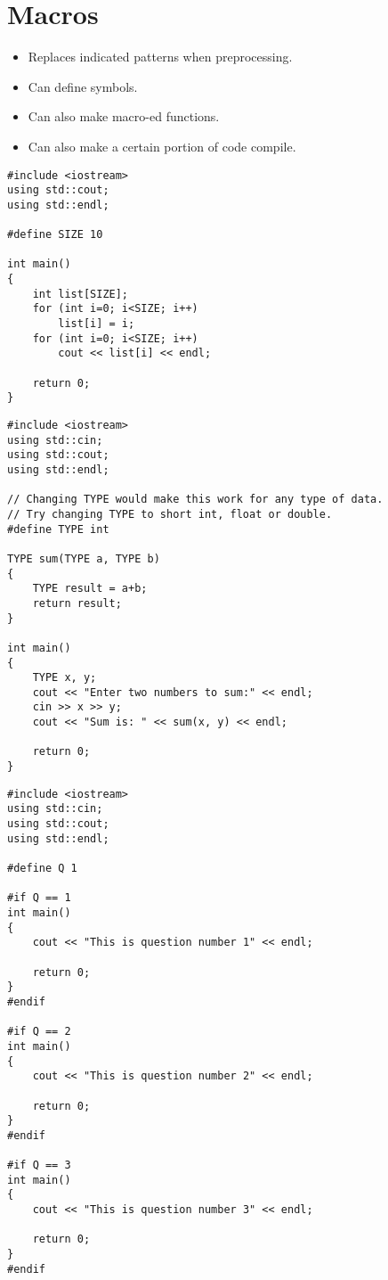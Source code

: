 \documentclass[12pt,a4paper]{article}
\begin{document}
\section{Macros}
\begin{itemize}
\item Replaces indicated patterns when preprocessing.
\item Can define symbols.
\item Can also make macro-ed functions.
\item Can also make a certain portion of code compile.
\end{itemize}
\begin{lstlisting}[caption={Using macro to define size}]
#include <iostream>
using std::cout;
using std::endl;

#define SIZE 10

int main()
{
	int list[SIZE];
	for (int i=0; i<SIZE; i++)
		list[i] = i;
	for (int i=0; i<SIZE; i++)
		cout << list[i] << endl;
	
	return 0;
}
\end{lstlisting}
\begin{lstlisting}[caption={Using macro to specify data type}]
#include <iostream>
using std::cin;
using std::cout;
using std::endl;

// Changing TYPE would make this work for any type of data.
// Try changing TYPE to short int, float or double.
#define TYPE int

TYPE sum(TYPE a, TYPE b)
{
	TYPE result = a+b;
	return result;
}

int main()
{
	TYPE x, y;
	cout << "Enter two numbers to sum:" << endl;
	cin >> x >> y;
	cout << "Sum is: " << sum(x, y) << endl;
	
	return 0;
}
\end{lstlisting}
\begin{lstlisting}[caption={Using macro to execute only portions of code}]
#include <iostream>
using std::cin;
using std::cout;
using std::endl;

#define Q 1

#if Q == 1
int main()
{
	cout << "This is question number 1" << endl;
	
	return 0;
}
#endif

#if Q == 2
int main()
{
	cout << "This is question number 2" << endl;
	
	return 0;
}
#endif

#if Q == 3
int main()
{
	cout << "This is question number 3" << endl;
	
	return 0;
}
#endif
\end{lstlisting}
\end{document}
